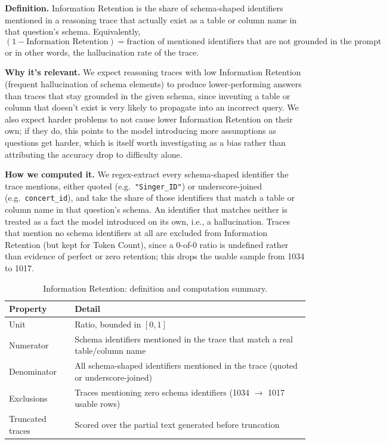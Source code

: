 \textbf{Definition.} Information Retention is the share of schema-shaped identifiers mentioned in a reasoning trace that actually exist as a table or column name in that question's schema. Equivalently, $$(1-\text{Information Retention})=\text{fraction of mentioned identifiers that are not grounded in the prompt}$$ or in other words, the hallucination rate of the trace.

\textbf{Why it's relevant.} We expect reasoning traces with low Information Retention (frequent hallucination of schema elements) to produce lower-performing answers than traces that stay grounded in the given schema, since inventing a table or column that doesn't exist is very likely to propagate into an incorrect query. We also expect harder problems to not cause lower Information Retention on their own; if they do, this points to the model introducing more assumptions as questions get harder, which is itself worth investigating as a bias rather than attributing the accuracy drop to difficulty alone.

\textbf{How we computed it.} We regex-extract every schema-shaped identifier the trace mentions, either quoted (e.g.\ \texttt{"Singer\_ID"}) or underscore-joined (e.g.\ \texttt{concert\_id}), and take the share of those identifiers that match a table or column name in that question's schema. An identifier that matches neither is treated as a fact the model introduced on its own, i.e., a hallucination. Traces that mention no schema identifiers at all are excluded from Information Retention (but kept for Token Count), since a 0-of-0 ratio is undefined rather than evidence of perfect or zero retention; this drops the usable sample from 1034 to 1017.

\begin{table}[H]
\centering
\footnotesize
\caption{Information Retention: definition and computation summary.}
\label{tab:rq2-feature-retention-summary}
\begin{tabular}{p{}p{}}
\toprule
Property & Detail \\
\midrule
Unit & Ratio, bounded in $[0,1]$ \\
Numerator & Schema identifiers mentioned in the trace that match a real table/column name \\
Denominator & All schema-shaped identifiers mentioned in the trace (quoted or underscore-joined) \\
Exclusions & Traces mentioning zero schema identifiers (1034 $\rightarrow$ 1017 usable rows) \\
Truncated traces & Scored over the partial text generated before truncation \\
\bottomrule
\end{tabular}
\end{table}

